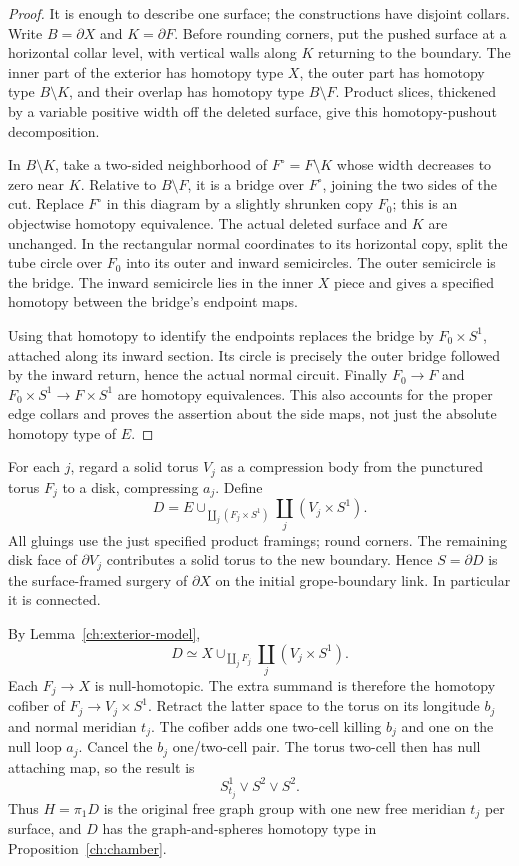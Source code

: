 \documentclass[11pt]{article}
\theoremstyle{definition}
\theoremstyle{remark}
\begin{document}
\begin{proof}
It is enough to describe one surface; the constructions have disjoint
collars.  Write $B=\partial X$ and $K=\partial F$.  Before rounding
corners, put the pushed surface at a horizontal collar level, with
vertical walls along $K$ returning to the boundary.  The inner part of
the exterior has homotopy type $X$, the outer part has homotopy type
$B\setminus K$, and their overlap has homotopy type $B\setminus F$.
Product slices, thickened by a variable positive width off the deleted
surface, give this homotopy-pushout decomposition.

In $B\setminus K$, take a two-sided neighborhood of
$F^\circ=F\setminus K$ whose width decreases to zero near $K$.
Relative to $B\setminus F$, it is a bridge over $F^\circ$, joining
the two sides of the cut.  Replace $F^\circ$ in this diagram by a
slightly shrunken copy $F_0$; this is an objectwise homotopy equivalence.
The actual deleted surface and $K$ are unchanged.  In the rectangular
normal coordinates to its horizontal copy, split the tube circle over
$F_0$ into its outer and inward semicircles.  The outer semicircle is
the bridge.  The inward semicircle lies in the inner $X$ piece and
gives a specified homotopy between the bridge's endpoint maps.

Using that homotopy to identify the endpoints replaces the bridge by
$F_0\times S^1$, attached along its inward section.  Its circle is
precisely the outer bridge followed by the inward return, hence the
actual normal circuit.  Finally $F_0\to F$ and
$F_0\times S^1\to F\times S^1$ are homotopy equivalences.  This
also accounts for the proper edge collars and proves the assertion
about the side maps, not just the absolute homotopy type of $E$.
\end{proof}

For each $j$, regard a solid torus $V_j$ as a compression body from
the punctured torus $F_j$ to a disk, compressing $a_j$.  Define
\[
 D=E\cup_{\coprod_j(F_j\times S^1)}
                  \coprod_j(V_j\times S^1).
\]
All gluings use the just specified product framings; round corners.
The remaining disk face of $\partial V_j$ contributes a solid torus
to the new boundary.  Hence $S=\partial D$ is the surface-framed
surgery of $\partial X$ on the initial grope-boundary link.  In
particular it is connected.

By Lemma~\ref{ch:exterior-model},
\[
 D\simeq X\cup_{\coprod_jF_j}\coprod_j(V_j\times S^1).
\]
Each $F_j\to X$ is null-homotopic.  The extra summand is therefore
the homotopy cofiber of $F_j\to V_j\times S^1$.  Retract the latter
space to the torus on its longitude $b_j$ and normal meridian $t_j$.
The cofiber adds one two-cell killing $b_j$ and one on the null loop
$a_j$.  Cancel the $b_j$ one/two-cell pair.  The torus two-cell then
has null attaching map, so the result is
\[
 S^1_{t_j}\vee S^2\vee S^2.
\]
Thus $H=\pi_1D$ is the original free graph group with one new free
meridian $t_j$ per surface, and $D$ has the graph-and-spheres homotopy
type in Proposition~\ref{ch:chamber}.
\end{document}
